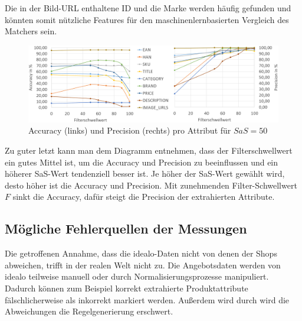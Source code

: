 Die in der Bild-URL enthaltene ID und die Marke werden häufig gefunden und könnten somit nützliche Features
für den maschinenlernbasierten Vergleich des Matchers sein.

\begin{figure}[H]
    \centering
    \includegraphics[width=\textwidth]{resources/accuracy-and-precision-per-attribute.PNG}
    \caption{Accuracy (links) und Precision (rechts) pro Attribut für $SaS=50$}
    \label{abb:testdaten}
    \vspace{-0.5cm}
\end{figure}

Zu guter letzt kann man dem Diagramm entnehmen, dass der Filterschwellwert ein gutes Mittel ist, um die Accuracy und
Precision zu beeinflussen und ein höherer SaS-Wert tendenziell besser ist.
Je höher der SaS-Wert gewählt wird, desto höher ist die Accuracy und Precision.
Mit zunehmenden Filter-Schwellwert $F$ sinkt die Accuracy, dafür steigt die Precision der extrahierten Attribute.

\subsection{Mögliche Fehlerquellen der Messungen}
\label{subsec:fehlerquellen}

Die getroffenen Annahme, dass die idealo-Daten nicht von denen der Shops abweichen, trifft in der realen Welt nicht zu.
Die Angebotsdaten werden von idealo teilweise manuell oder durch Normalisierungsprozesse manipuliert.
Dadurch können zum Beispiel korrekt extrahierte Produktattribute fälschlicherweise als inkorrekt markiert werden.
Außerdem wird durch wird die Abweichungen die Regelgenerierung erschwert.